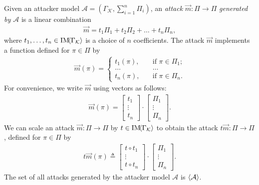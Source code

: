 {%
\begin{definition}[Attack]
  \label{def:CPSRobustness:Attack}
Given an attacker model $\mathcal{A}=(\Gamma_{\mathcal{K}}, \sum_{i=1}^n\Pi_i)$,
 an \emph{attack} $\vec{m}\colon \Pi\rightarrow \Pi$ \emph{generated by $\mathcal{A}$} is a linear combination
\begin{align}
  \vec{m}=t_1\Pi_1 + t_2\Pi_2 + \ldots + t_n\Pi_n,
\end{align} 
where $t_1, \ldots, t_n\in\text{IM}\!{{\left<\Gamma_{\mathcal{K}}\right>}}$ is a choice of $n$ coefficients. The attack $\vec{m}$ implements a function defined for $\pi\in \Pi$ by
\begin{align}
  \label{eq:AttackVector}
  \vec{m}(\pi)=
    \begin{cases}
      t_1(\pi), &\quad\text{if $\pi\in \Pi_1$;}\\
      \ldots&\quad\ldots\\
      t_n(\pi), &\quad\text{if $\pi\in \Pi_n$.}
    \end{cases}
\end{align}
For convenience, we write $\vec{m}$ using vectors as follows: 
\begin{align}
  \vec{m}(\pi)=
  \begin{bmatrix}
    t_{1} \\
    \vdots \\
    t_{n}
  \end{bmatrix}
  \cdot
  \begin{bmatrix}
    \Pi_{1} \\
    \vdots \\
    \Pi_{n}
  \end{bmatrix}.
\end{align} 
We can scale an attack $\vec{m}\colon \Pi\rightarrow \Pi$ by $t\in \text{IM}\!{{\left<\Gamma_{\mathcal{K}}\right>}}$ to obtain the attack $t\vec{m}\colon \Pi\rightarrow \Pi$, defined for $\pi\in \Pi$ by
\begin{align}
  t\vec{m}(\pi)\triangleq
  \begin{bmatrix}
    t\circ t_{1} \\
    \vdots \\
    t\circ t_{n}
  \end{bmatrix}
  \cdot
  \begin{bmatrix}
    \Pi_{1} \\
    \vdots \\
    \Pi_{n}
  \end{bmatrix}.
\end{align} 
The set of all attacks generated by the attacker model $\mathcal{A}$ is ${{\left<\mathcal{A}\right>}}$.


\end{definition}}
